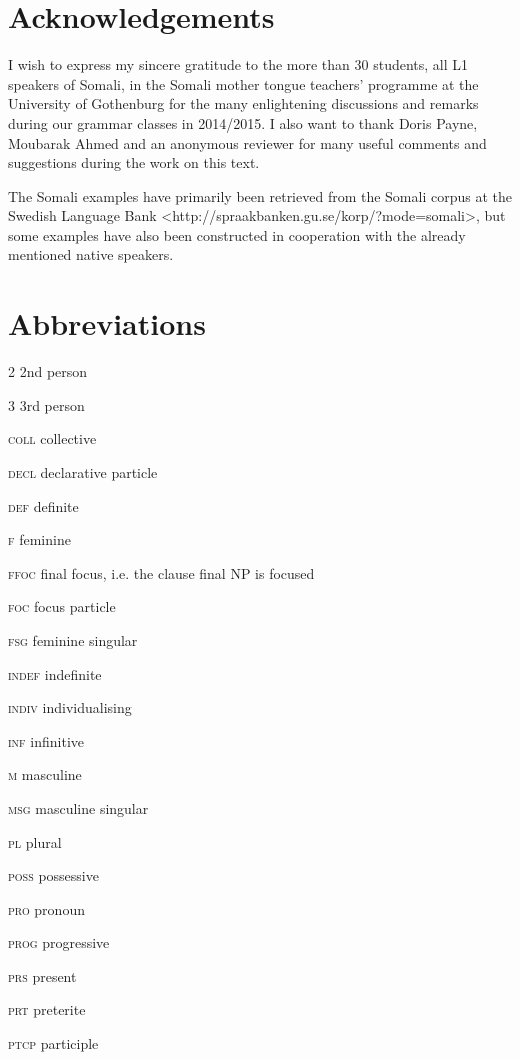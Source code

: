 \documentclass[output=paper]{langsci/langscibook}
\begin{document}
\section*{Acknowledgements}

I wish to express my sincere gratitude to the more than 30 students, all L1 speakers of Somali, in the Somali mother tongue teachers’ programme at the University of Gothenburg for the many enlightening discussions and remarks during our grammar classes in 2014/2015. I also want to thank Doris Payne, Moubarak Ahmed and an anonymous reviewer for many useful comments and suggestions during the work on this text.

The Somali examples have primarily been retrieved from the Somali corpus at the Swedish Language Bank {\textless}http://spraakbanken.gu.se/korp/?mode=somali{\textgreater}, but some examples have also been constructed in cooperation with the already mentioned native speakers.

\section*{Abbreviations}

2  2nd person

3  3rd person

\textsc{coll}  collective

\textsc{decl}  declarative particle

\textsc{def}  definite

\textsc{f}  feminine

\textsc{ffoc}  final focus, i.e. the clause final NP is focused

\textsc{foc}  focus particle

\textsc{fsg}  feminine singular

\textsc{indef}  indefinite

\textsc{indiv}  individualising

\textsc{inf  }infinitive

\textsc{m}  masculine

\textsc{msg}  masculine singular

\textsc{pl}  plural

\textsc{poss}  possessive

\textsc{pro}  pronoun

\textsc{prog}  progressive

\textsc{prs}  present

\textsc{prt}  preterite

\textsc{ptcp  }participle
\end{document}
